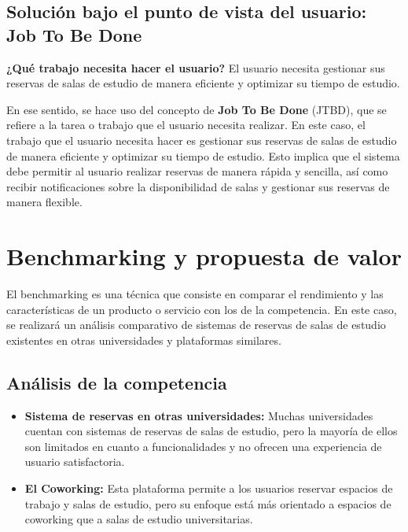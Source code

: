 \documentclass{article}
\begin{document}
    \subsection{Solución bajo el punto de vista del usuario: \textbf{Job To Be Done}}

    \textbf{¿Qué trabajo necesita hacer el usuario?} El usuario necesita gestionar sus reservas de salas de estudio de manera eficiente y optimizar su tiempo de estudio.

    En ese sentido, se hace uso del concepto de \textbf{Job To Be Done} (JTBD), que se refiere a la tarea o trabajo que el usuario necesita realizar. En este caso, el trabajo que el usuario necesita hacer es gestionar sus reservas de salas de estudio de manera eficiente y optimizar su tiempo de estudio. Esto implica que el sistema debe permitir al usuario realizar reservas de manera rápida y sencilla, así como recibir notificaciones sobre la disponibilidad de salas y gestionar sus reservas de manera flexible.

    \section{Benchmarking y propuesta de valor}

    El benchmarking es una técnica que consiste en comparar el rendimiento y las características de un producto o servicio con los de la competencia. En este caso, se realizará un análisis comparativo de sistemas de reservas de salas de estudio existentes en otras universidades y plataformas similares.

    \subsection{Análisis de la competencia}
    \begin{itemize}
      \item \textbf{Sistema de reservas en otras universidades:} Muchas universidades cuentan con sistemas de reservas de salas de estudio, pero la mayoría de ellos son limitados en cuanto a funcionalidades y no ofrecen una experiencia de usuario satisfactoria.
      
      \item \textbf{El Coworking:} Esta plataforma permite a los usuarios reservar espacios de trabajo y salas de estudio, pero su enfoque está más orientado a espacios de coworking que a salas de estudio universitarias.
      \end{itemize}
\end{document}
